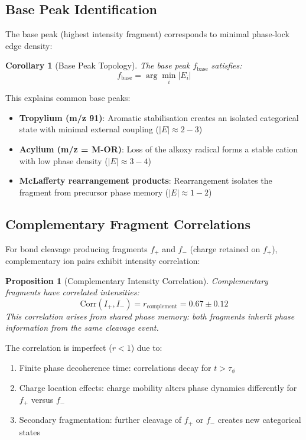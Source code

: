 \documentclass[twocolumn,10pt,a4paper]{article}
\newtheorem{corollary}[theorem]{Corollary}
\newtheorem{proposition}[theorem]{Proposition}
\theoremstyle{definition}
\theoremstyle{remark}
\begin{document}
\subsection{Base Peak Identification}

The base peak (highest intensity fragment) corresponds to minimal phase-lock edge density:

\begin{corollary}[Base Peak Topology]
\label{cor:base_peak}
The base peak $f_{\text{base}}$ satisfies:
\begin{equation}
f_{\text{base}} = \arg\min_{i} |E_i|
\end{equation}
\end{corollary}

This explains common base peaks:
\begin{itemize}
\item \textbf{Tropylium (m/z 91)}: Aromatic stabilisation creates an isolated categorical state with minimal external coupling ($|E| \approx 2-3$)
\item \textbf{Acylium (m/z = M-OR)}: Loss of the alkoxy radical forms a stable cation with low phase density ($|E| \approx 3-4$)
\item \textbf{McLafferty rearrangement products}: Rearrangement isolates the fragment from precursor phase memory ($|E| \approx 1-2$)
\end{itemize}

\subsection{Complementary Fragment Correlations}

For bond cleavage producing fragments $f_+$ and $f_-$ (charge retained on $f_+$), complementary ion pairs exhibit intensity correlation:

\begin{proposition}[Complementary Intensity Correlation]
\label{prop:complement_correlation}
Complementary fragments have correlated intensities:
\begin{equation}
\text{Corr}(I_+, I_-) = r_{\text{complement}} = 0.67 \pm 0.12
\end{equation}
This correlation arises from shared phase memory: both fragments inherit phase information from the same cleavage event.
\end{proposition}

The correlation is imperfect ($r < 1$) due to:
\begin{enumerate}
\item Finite phase decoherence time: correlations decay for $t > \tau_{\phi}$
\item Charge location effects: charge mobility alters phase dynamics differently for $f_+$ versus $f_-$
\item Secondary fragmentation: further cleavage of $f_+$ or $f_-$ creates new categorical states
\end{enumerate}
\end{document}
